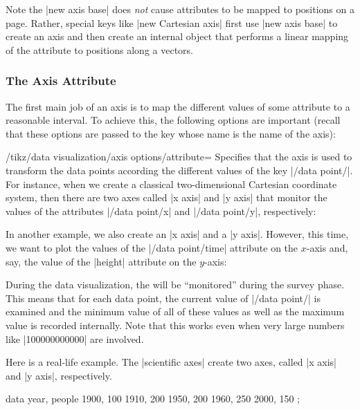 Note the |new axis base| does \emph{not} cause attributes to be mapped to
positions on a page. Rather, special keys like |new Cartesian axis| first use
|new axis base| to create an axis and then create an internal object that
performs a linear mapping of the attribute to positions along a vectors.


\subsubsection{The Axis Attribute}
\label{section-dv-axis-attribute}

The first main job of an axis is to map the different values of some attribute
to a reasonable interval. To achieve this, the following options are important
(recall that these options are passed to the key whose name is the name of the
axis):

\begin{key}{/tikz/data visualization/axis options/attribute=}
    Specifies that the axis is used to transform the data points according the
    different values of the key |/data point/|. For instance,
    when we create a classical two-dimensional Cartesian coordinate system,
    then there are two axes called |x axis| and |y axis| that monitor the
    values of the attributes |/data point/x| and |/data point/y|, respectively:
\begin{codeexample}
\end{codeexample}
    In another example, we also create an |x axis| and a |y axis|. However,
    this time, we want to plot the values of the |/data point/time| attribute
    on the $x$-axis and, say, the value of the |height| attribute on the
    $y$-axis:
\begin{codeexample}
\end{codeexample}
    During the data visualization, the  will be ``monitored''
    during the survey phase. This means that for each data point, the current
    value of |/data point/| is examined and the minimum value
    of all of these values as well as the maximum value is recorded internally.
    Note that this works even when very large numbers like |100000000000| are
    involved.

    Here is a real-life example. The |scientific axes| create two axes, called
    |x axis| and |y axis|, respectively.
\begin{codeexample}[preamble={\usetikzlibrary{datavisualization}}]
\tikz \datavisualization [scientific axes,
                          x axis={attribute=people, length=2.5cm, ticks=few},
                          y axis={attribute=year},
                          visualize as scatter]
  data {
    year, people
    1900, 100
    1910, 200
    1950, 200
    1960, 250
    2000, 150
  };
\end{codeexample}
\end{key}


